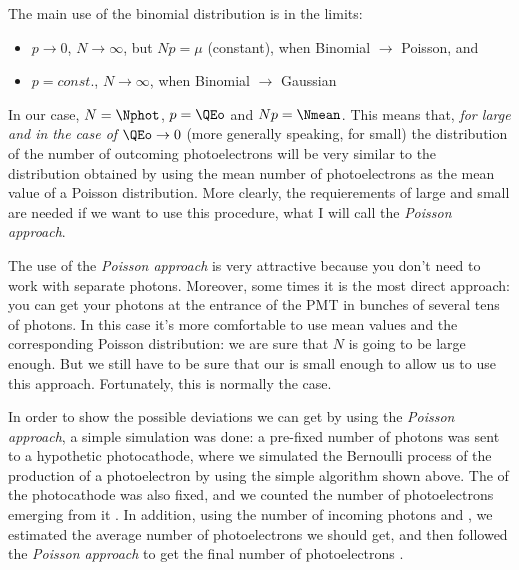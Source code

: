 \noutqesmallfig

\varquotfig

\vonneumannfig

The main use of the binomial distribution is in the limits:
%
\begin{itemize}
\item $p\rightarrow 0$, $N\rightarrow\infty$, but $Np=\mu$ (constant),
  when Binomial $\longrightarrow$ Poisson, and
\item $p=const.$, $N\rightarrow\infty$, when Binomial
  $\longrightarrow$ Gaussian
\end{itemize}
%
In our case, $N=\Nphot$, $p=\QEo$ and $Np=\Nmean$.  This means that,
\emph{for \Nphot large and in the case of $\QEo\rightarrow 0$} (more
generally speaking, for \QEo small) the distribution of the number of
outcoming photoelectrons \Ntrial will be very similar to the
distribution obtained by using the mean number of photoelectrons
\Nmean as the mean value of a Poisson distribution. More clearly, the
requierements of \Nphot large and \QEo small are needed if we want to
use this procedure, what I will call the \emph{Poisson approach}.

The use of the \emph{Poisson approach} is very attractive because you
don't need to work with separate photons. Moreover, some times it is
the most direct approach: you can get your photons at the entrance of
the PMT in bunches of several tens of photons. In this case it's more
comfortable to use mean values and the corresponding Poisson
distribution: we are sure that $N$ is going to be large enough. But we
still have to be sure that our \QEo is small enough to allow us to use
this approach. Fortunately, this is normally the case.

\timeresponsefig

In order to show the possible deviations we can get by using the
\emph{Poisson approach}, a simple simulation was done: a pre-fixed
number of photons \Nphot was sent to a hypothetic photocathode, where
we simulated the Bernoulli process of the production of a
photoelectron by using the simple algorithm shown above.  The \QEo of
the photocathode was also fixed, and we counted the number of
photoelectrons emerging from it \Ntrial.  In addition, using the
number of incoming photons and \QEo, we estimated the average number
of photoelectrons \Nmean we should get, and then followed the
\emph{Poisson approach} to get the final number of photoelectrons
\Nrand.

